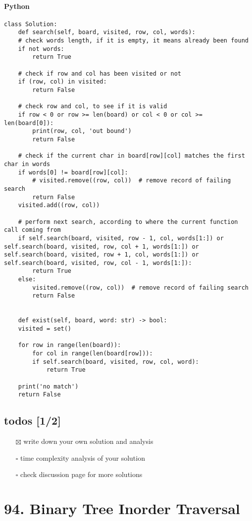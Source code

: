 \documentclass[11pt]{article}
\begin{document}
\paragraph{Python}
\label{sec:orga8f9474}
\begin{verbatim}
class Solution:
    def search(self, board, visited, row, col, words):
	# check words length, if it is empty, it means already been found
	if not words:
	    return True

	# check if row and col has been visited or not
	if (row, col) in visited:
	    return False

	# check row and col, to see if it is valid
	if row < 0 or row >= len(board) or col < 0 or col >= len(board[0]):
	    print(row, col, 'out bound')
	    return False

	# check if the current char in board[row][col] matches the first char in words
	if words[0] != board[row][col]:
	    # visited.remove((row, col))  # remove record of failing search
	    return False
	visited.add((row, col))

	# perform next search, according to where the current function call coming from
	if self.search(board, visited, row - 1, col, words[1:]) or self.search(board, visited, row, col + 1, words[1:]) or self.search(board, visited, row + 1, col, words[1:]) or self.search(board, visited, row, col - 1, words[1:]):
	    return True
	else:
	    visited.remove((row, col))  # remove record of failing search
	    return False


    def exist(self, board, word: str) -> bool:
	visited = set()

	for row in range(len(board)):
	    for col in range(len(board[row])):
		if self.search(board, visited, row, col, word):
		    return True

	print('no match')
	return False
\end{verbatim}
\subsection{todos [1/2]}
\label{sec:org4dd4d05}
\begin{itemize}
\item[{$\boxtimes$}] write down your own solution and analysis
\item[{$\square$}] time complexity analysis of your solution
\item[{$\square$}] check discussion page for more solutions
\end{itemize}
\section{94. Binary Tree Inorder Traversal}
\label{sec:org0374bf4}
\end{document}
